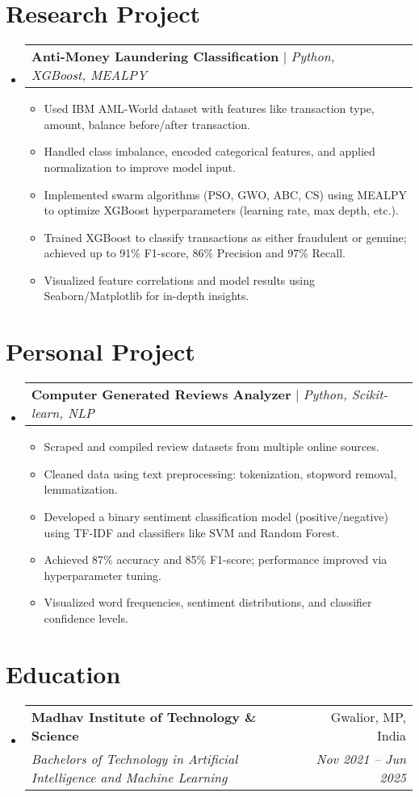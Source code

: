 \documentclass[letterpaper,11pt]{article}
\makeatletter
\newcommand{\resumeItem}[1]{
  \item\small{
    {#1 \vspace{-2pt}}
  }
}
\newcommand{\resumeSubheading}[4]{
  \vspace{-2pt}\item
    \begin{tabular*}{0.97\textwidth}[t]{l@{\extracolsep{\fill}}r}
      \textbf{#1} & #2 \\
      \textit{\small#3} & \textit{\small #4} \\
    \end{tabular*}\vspace{-7pt}
}
\newcommand{\resumeProjectHeading}[2]{
    \item
    \begin{tabular*}{0.97\textwidth}{l@{\extracolsep{\fill}}r}
      \small#1 & #2 \\
    \end{tabular*}\vspace{-7pt}
}
\newcommand{\resumeSubHeadingListStart}{\begin{itemize}[leftmargin=0.15in, label={}]}
\newcommand{\resumeSubHeadingListEnd}{\end{itemize}}
\newcommand{\resumeItemListStart}{\begin{itemize}}
\newcommand{\resumeItemListEnd}{\end{itemize}\vspace{-5pt}}
\makeatother
\begin{document}
\section{Research Project}

  \resumeSubHeadingListStart
    \resumeProjectHeading
      {\textbf{Anti-Money Laundering Classification} $|$ \emph{Python, XGBoost, MEALPY}}{}
      \resumeItemListStart
        \resumeItem{Used IBM AML-World dataset with features like transaction type, amount, balance before/after transaction.}
        \resumeItem{Handled class imbalance, encoded categorical features, and applied normalization to improve model input.}
        \resumeItem{Implemented swarm algorithms (PSO, GWO, ABC, CS) using MEALPY to optimize XGBoost hyperparameters (learning rate, max depth, etc.).}
        \resumeItem{Trained XGBoost to classify transactions as either fraudulent or genuine; achieved up to 91\% F1-score, 86\% Precision and 97\% Recall.}
        \resumeItem{Visualized feature correlations and model results using Seaborn/Matplotlib for in-depth insights.}
      \resumeItemListEnd
  \resumeSubHeadingListEnd


\section{Personal Project}

  \resumeSubHeadingListStart
    \resumeProjectHeading
      {\textbf{Computer Generated Reviews Analyzer} $|$ \emph{Python, Scikit-learn, NLP}}{}
      \resumeItemListStart
        \resumeItem{Scraped and compiled review datasets from multiple online sources.}
        \resumeItem{Cleaned data using text preprocessing: tokenization, stopword removal, lemmatization.}
        \resumeItem{Developed a binary sentiment classification model (positive/negative) using TF-IDF and classifiers like SVM and Random Forest.}
        \resumeItem{Achieved 87\% accuracy and 85\% F1-score; performance improved via hyperparameter tuning.}
        \resumeItem{Visualized word frequencies, sentiment distributions, and classifier confidence levels.}
      \resumeItemListEnd
  \resumeSubHeadingListEnd

\section{Education}
  \resumeSubHeadingListStart
    \resumeSubheading
      {Madhav Institute of Technology \& Science}{Gwalior, MP, India}
        {Bachelors of Technology in Artificial Intelligence and Machine Learning}{Nov 2021 -- Jun 2025}
  \resumeSubHeadingListEnd

\end{document}
